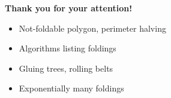 \documentclass[11pt,a4paper]{extarticle}
\begin{document}
{\large \bf Thank you for your attention!}

\begin{itemize}
	\item Not-foldable polygon, perimeter halving
	\item Algorithms listing foldings
	\item Gluing trees, rolling belts
	\item Exponentially many foldings
\end{itemize} \newpage


\end{document}
